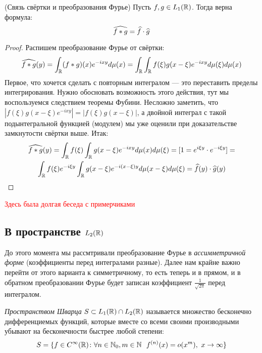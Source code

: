 \begin{proposition} (Связь свёртки и преобразования Фурье)
	Пусть $f, g \in L_1(\mathbb{R})$. Тогда верна формула:
	\[
		\widehat{f * g} = \widehat{f} \cdot \widehat{g} 
	\]
\end{proposition}

\begin{proof}
	Распишем преобразование Фурье от свёртки:
	\[
		\widehat{f * g}(y) = \int_{\mathbb{R}} (f * g)(x)e^{-ixy}d\mu(x) = \int_{\mathbb{R}} \int_{\mathbb{R}} f(\xi)g(x - \xi)e^{-ixy}d\mu(\xi)d\mu(x)
	\]
	Первое, что хочется сделать с повторным интегралом --- это переставить пределы интегрирования. Нужно обосновать возможность этого действия, тут мы воспользуемся следствием теоремы Фубини. Несложно заметить, что $|f(\xi)g(x - \xi)e^{-ixy}| = |f(\xi)g(x - \xi)|$, а двойной интеграл с такой подынтегральной функцией (модулем) мы уже оценили при доказательстве замкнутости свёртки выше. Итак:
	\begin{multline*}
		\widehat{f * g}(y) = \int_{\mathbb{R}} f(\xi) \int_{\mathbb{R}} g(x - \xi)e^{-ixy}d\mu(x)d\mu(\xi) = [1 = e^{i\xi y} \cdot e^{-i\xi y}] =
		\\
		\int_{\mathbb{R}} f(\xi)e^{-i\xi y} \int_{\mathbb{R}} g(x - \xi)e^{-i(x - \xi)y}d\mu(x - \xi)d\mu(\xi) = \widehat{f}(y) \cdot \widehat{g}(y)
	\end{multline*}
	 
\end{proof}

\textcolor{red}{Здесь была долгая беседа с примерчиками}

\subsection{В пространстве $L_2(\mathbb{R})$}

\begin{note}
	До этого момента мы рассмтривали преобразование Фурье в \textit{ассимметричной форме} (коэффициенты перед интегралами разные). Далее нам крайне важно перейти от этого варианта к симметричному, то есть теперь и в прямом, и в обратном преобразовании Фурье будет записан коэффициент $\frac{1}{\sqrt{2\pi}}$ перед интегралом.
\end{note}

\begin{reminder}
	\textit{Пространством Шварца} $S \subset L_1(\mathbb{R}) \cap L_2(\mathbb{R})$ называется множество бесконечно дифференциемых функций, которые вместе со всеми своими производными убывают на бесконечности быстрее любой степени:
	\[
		S = \{f \in C^\infty(\mathbb{R}) \colon \forall n \in \mathbb{N}_0, m \in \mathbb{N}\ \ f^{(n)}(x) = o(x^m),\ x \to \infty\}
	\]
\end{reminder}

